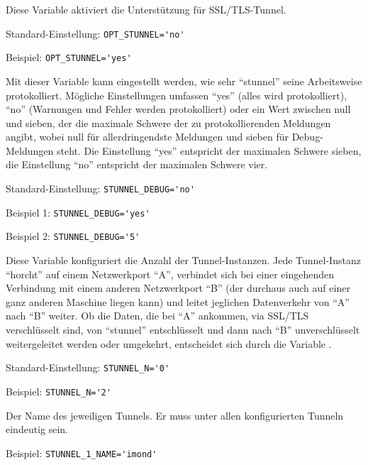 \begin{description}


Diese Variable aktiviert die Unterstützung für SSL/TLS-Tunnel.

Standard-Einstellung: \verb+OPT_STUNNEL='no'+

Beispiel: \verb+OPT_STUNNEL='yes'+


Mit dieser Variable kann eingestellt werden, wie sehr ``stunnel'' seine
Arbeitsweise protokolliert. Mögliche Einstellungen umfassen ``yes'' (alles wird
protokolliert), ``no'' (Warnungen und Fehler werden protokolliert) oder ein
Wert zwischen null und sieben, der die maximale Schwere der zu protokollierenden
Meldungen angibt, wobei null für allerdringendste Meldungen und sieben für
Debug-Meldungen steht. Die Einstellung ``yes'' entspricht der maximalen Schwere
sieben, die Einstellung ``no'' entspricht der maximalen Schwere vier.

Standard-Einstellung: \verb+STUNNEL_DEBUG='no'+

Beispiel 1: \verb+STUNNEL_DEBUG='yes'+

Beispiel 2: \verb+STUNNEL_DEBUG='5'+

Diese Variable konfiguriert die Anzahl der Tunnel-Instanzen. Jede Tunnel-Instanz
``horcht'' auf einem Netzwerkport ``A'', verbindet sich bei einer eingehenden
Verbindung mit einem anderen Netzwerkport ``B'' (der durchaus auch auf einer
ganz anderen Maschine liegen kann) und leitet jeglichen Datenverkehr von ``A''
nach ``B'' weiter.  Ob die Daten, die bei ``A'' ankommen, via SSL/TLS
verschlüsselt sind, von ``stunnel'' entschlüsselt und dann nach ``B''
unverschlüsselt weitergeleitet werden oder umgekehrt, entscheidet sich durch
die Variable .

Standard-Einstellung: \verb+STUNNEL_N='0'+

Beispiel: \verb+STUNNEL_N='2'+


Der Name des jeweiligen Tunnels. Er muss unter allen konfigurierten Tunneln
eindeutig sein.

Beispiel: \verb+STUNNEL_1_NAME='imond'+



\end{description}

